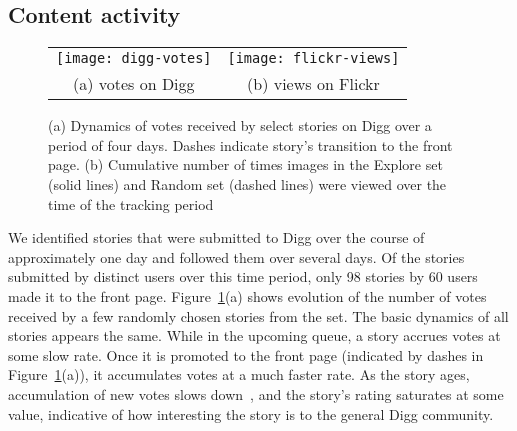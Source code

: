 \documentclass[]{article}
\newcommand{\source}[1]{\textsf{#1}}
\newcommand{\figref}[1]{Figure~\ref{#1}}
\begin{document}
\subsection{Content activity}
\begin{figure}[tbh]
\begin{tabular}{cc}
  \texttt{[image: digg-votes]} &
  \texttt{[image: flickr-views]} \\
  (a) votes on Digg & (b) views on Flickr
  \end{tabular}
\caption{ (a) Dynamics of votes received by select stories on Digg over a period
of four days. Dashes indicate story's transition to the front page.
(b) Cumulative number of times images in the \source{Explore} set (solid lines) and
  \source{Random} set (dashed lines) were viewed over the time of the tracking period
} \label{fig:dynamics}
\end{figure}

We identified stories that were submitted to Digg over the course of
approximately one day and followed them over
several days. Of the  stories submitted by 
distinct users over this time period, only 98 stories by 60 users
made it to the front page. \figref{fig:dynamics}(a) shows evolution of
the number of votes received by a few randomly chosen stories from the set.
The basic dynamics of all
stories appears the same. While in the upcoming queue, a story
accrues votes at some slow rate. Once it is promoted to the front page
(indicated by dashes in \figref{fig:dynamics}(a)),
it accumulates votes at a much faster rate. As the story ages,
accumulation of new votes slows down~\cite{Wu07}, and the story's rating
saturates at some value, indicative of how interesting the story is to the general Digg community.

\end{document}
